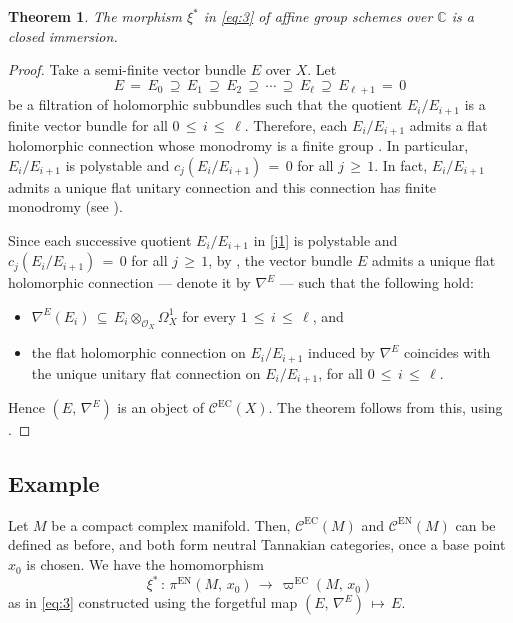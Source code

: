 \documentclass[12pt]{amsart}
\newtheorem{theorem}{Theorem}[section]
\theoremstyle{definition}
\numberwithin{equation}{section}
\newcommand{\C}{\mathbb{C}}
\newcommand{\EC}{\mathcal{C}^\mathrm{EC}}
\begin{document}
\begin{theorem}\label{main-thm}
The morphism $\xi^*$ in \eqref{eq:3} of affine group schemes over $\C$ is a closed immersion.
\end{theorem}

\begin{proof}
Take a semi-finite vector bundle $E$ over $X$. Let
\begin{equation}\label{j1}
E\,=\,E_0\, \supseteq\, E_1\, \supseteq\, E_2\, \supseteq\, \cdots\, \supseteq\, E_\ell\,
\supseteq\, E_{\ell+1}\, =\, 0
\end{equation}
be a filtration of holomorphic subbundles such that the quotient $E_i/E_{i+1}$ is a finite vector
bundle for all $0\, \leq\, i\, \leq\, \ell$. Therefore, each $E_i/E_{i+1}$ admits a flat holomorphic
connection whose monodromy is a finite group \cite[Theorem 2.3]{BHS}. In particular, $E_i/E_{i+1}$
is polystable and $c_j(E_i/E_{i+1})\,=\, 0$ for all $j\, \geq\, 1$. In fact, $E_i/E_{i+1}$ admits a
unique flat unitary connection and this connection has finite monodromy (see \cite{BHS}). 

Since each successive quotient $E_i/E_{i+1}$ in \eqref{j1} is polystable and $c_j(E_i/E_{i+1})\,=\, 0$
for all $j\, \geq\, 1$, by \cite[Corollary 3.10 and its following remark]{Si}, the vector bundle $E$ admits
a unique flat holomorphic connection --- denote it by $\nabla^E$ --- such that the following hold:
\begin{itemize}
\item $\nabla^E(E_i)\, \subseteq\, E_i \otimes_{\mathcal{O}_X} \Omega_X^1$ for every
$1\, \leq\, i\, \leq\, \ell$, and

\item the flat holomorphic connection on $E_i/E_{i+1}$ induced by $\nabla^E$ coincides with the
unique unitary flat connection on $E_i/E_{i+1}$, for all $0\, \leq\, i\, \leq\, \ell$.
\end{itemize}
 
Hence $(E,\, \nabla^E)$ is an object of $\EC(X)$. The theorem follows from this, using
\cite[Proposition 2.21]{DM}.
\end{proof}

\subsection*{Example}

Let $M$ be a compact complex manifold. Then, $\EC(M)$ and $\mathcal{C}^{\mathrm{EN}}(M)$ 
can be defined as before, and both form neutral Tannakian categories, once a base point $x_0$ is chosen. We have the homomorphism
$$
\xi^* \,:\, \pi^{\mathrm{EN}}(M,\,x_0) \,\longrightarrow\, \varpi^{\mathrm{EC}}(M,\, x_0)
$$
as in \eqref{eq:3} constructed using the forgetful map $(E,\, \nabla^E) \, \longmapsto\, E$.
\end{document}
